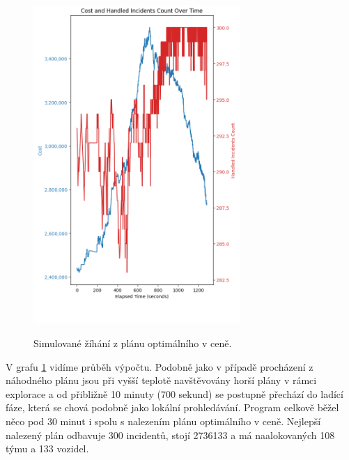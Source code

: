 \begin{figure}[H]
  \caption{Simulované žíhání z plánu optimálního v ceně.}
  \includegraphics[width=0.7\textwidth,height=0.9\textwidth]{img/plots/sa_optimal.png}
  \centering
  \label{img:sa_optimal}
\end{figure}

V grafu \ref{img:sa_optimal} vidíme průběh výpočtu.
Podobně jako v případě procházení z náhodného plánu jsou při vyšší teplotě navštěvovány horší plány v rámci explorace a od přibližně 
10 minuty (700 sekund) se postupně přechází do ladící fáze, která se chová podobně jako lokální prohledávání.
Program celkově běžel něco pod 30 minut i spolu s nalezením plánu optimálního v ceně.
Nejlepší nalezený plán odbavuje 300 incidentů, stojí 2736133 a má naalokovaných 108 týmu a 133 vozidel.

\
